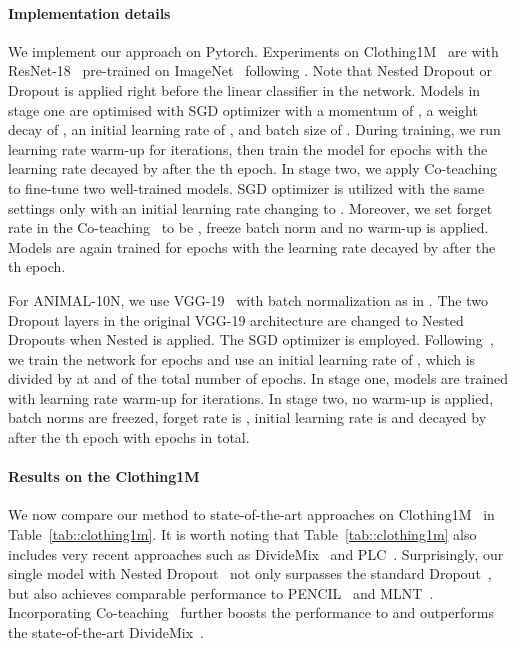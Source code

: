 \documentclass[final]{cvpr}
\begin{document}
\paragraph{Implementation details}
We implement our approach on Pytorch. Experiments on Clothing1M~\cite{xiao2015learning} are with ResNet-18~\cite{he2016deep} pre-trained on ImageNet~\cite{deng2009imagenet} following \cite{wei2020combating}. 
Note that Nested Dropout or Dropout is applied right before the linear classifier in the network.
Models in stage one are optimised with SGD optimizer with a momentum of , a weight decay of , an initial learning rate of , and batch size of . 
During training, we run learning rate warm-up for  iterations, then train the model for  epochs with the learning rate decayed by  after the th epoch. 
In stage two, we apply Co-teaching to fine-tune two well-trained models. SGD optimizer is utilized with the same settings only with an initial learning rate changing to . 
Moreover, we set 
forget rate  in the Co-teaching~\cite{han2018co} to be , freeze batch norm and no warm-up is applied. Models are again trained for  epochs with the learning rate decayed by  after the th epoch.

For ANIMAL-10N, we use VGG-19~\cite{simonyan2014very} with batch normalization \cite{ioffe2015batch} as in \cite{song2019selfie}. 
The two Dropout layers in the original VGG-19 architecture are changed to Nested Dropouts when Nested is applied.
The SGD optimizer is employed. Following~\cite{song2019selfie}, we train the network for  epochs and use an initial learning rate of , which is divided by  at  and  of the total number of epochs. In stage one, models are trained with learning rate warm-up for  iterations. 
In stage two, no warm-up is applied, batch norms are freezed, forget rate  is , initial learning rate is  and decayed by  after the th epoch with  epochs in total. 

\vspace{-3mm}
\paragraph{Results on the Clothing1M~\cite{xiao2015learning}} 
We now compare our method to state-of-the-art approaches on Clothing1M~\cite{xiao2015learning} in Table~\ref{tab::clothing1m}. 
It is worth noting that Table~\ref{tab::clothing1m} also includes very recent approaches such as DivideMix~\cite{li2020dividemix} and PLC~\cite{zhang2021learning}. 
Surprisingly, our single model with Nested Dropout~\cite{rippel2014learning} not only surpasses the standard Dropout~\cite{srivastava2014dropout}, but also achieves comparable performance to PENCIL~\cite{PENCIL_CVPR_2019} and MLNT~\cite{PENCIL_CVPR_2019}. 
Incorporating Co-teaching~\cite{han2018co} further boosts the performance to  and outperforms the state-of-the-art DivideMix~\cite{li2020dividemix}. 
\end{document}
